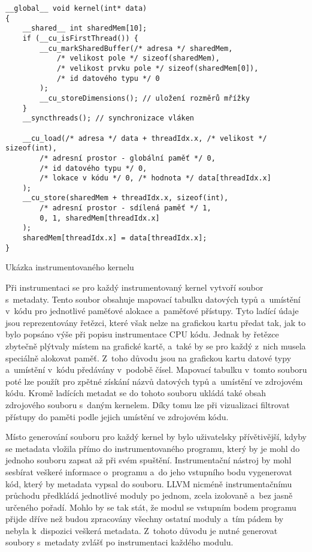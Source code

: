 \begin{listing}
\begin{verbatim}
__global__ void kernel(int* data)
{
    __shared__ int sharedMem[10];
    if (__cu_isFirstThread()) {
        __cu_markSharedBuffer(/* adresa */ sharedMem,
            /* velikost pole */ sizeof(sharedMem),
            /* velikost prvku pole */ sizeof(sharedMem[0]),
            /* id datového typu */ 0
        );
        __cu_storeDimensions(); // uložení rozměrů mřížky
    }
    __syncthreads(); // synchronizace vláken
    
    __cu_load(/* adresa */ data + threadIdx.x, /* velikost */ sizeof(int),
        /* adresní prostor - globální paměť */ 0,
        /* id datového typu */ 0,
        /* lokace v kódu */ 0, /* hodnota */ data[threadIdx.x]
    );
    __cu_store(sharedMem + threadIdx.x, sizeof(int),
        /* adresní prostor - sdílená paměť */ 1,
        0, 1, sharedMem[threadIdx.x]
    );
    sharedMem[threadIdx.x] = data[threadIdx.x];
}
\end{verbatim}
\caption{Ukázka instrumentovaného kernelu}
\label{code:instrumentedkernel}
\end{listing}

Při instrumentaci se pro každý instrumentovaný kernel vytvoří soubor s~metadaty. Tento soubor obsahuje mapovací tabulku datových typů a~umístění v~kódu pro jednotlivé paměťové alokace a~paměťové přístupy. Tyto ladící údaje jsou reprezentovány řetězci, které však nelze na grafickou kartu předat tak, jak to bylo popsáno výše při popisu instrumentace CPU kódu. Jednak by řetězce zbytečně plýtvaly místem na grafické kartě, a~také by se pro každý z~nich musela speciálně alokovat paměť. Z~toho důvodu jsou na grafickou kartu datové typy a~umístění v~kódu předávány v~podobě čísel. Mapovací tabulku v~tomto souboru poté lze použít pro zpětné získání názvů datových typů a~umístění ve zdrojovém kódu. Kromě ladících metadat se do tohoto souboru ukládá také obsah zdrojového souboru s~daným kernelem. Díky tomu lze při vizualizaci filtrovat přístupy do paměti podle jejich umístění ve zdrojovém kódu.
    
Místo generování souboru pro každý kernel by bylo uživatelsky přívětivější, kdyby se metadata vložila přímo do instrumentovaného programu, který by je mohl do jednoho souboru zapsat až při svém spuštění. Instrumentační nástroj by mohl sesbírat veškeré informace o~programu a~do jeho vstupního bodu vygenerovat kód, který by metadata vypsal do souboru. LLVM nicméně instrumentačnímu průchodu předkládá jednotlivé moduly po jednom, zcela izolovaně a~bez jasně určeného pořadí. Mohlo by se tak stát, že modul se vstupním bodem programu přijde dříve než budou zpracovány všechny ostatní moduly a~tím pádem by nebyla k~dispozici veškerá metadata. Z~tohoto důvodu je nutné generovat soubory s~metadaty zvlášť po instrumentaci každého modulu.

